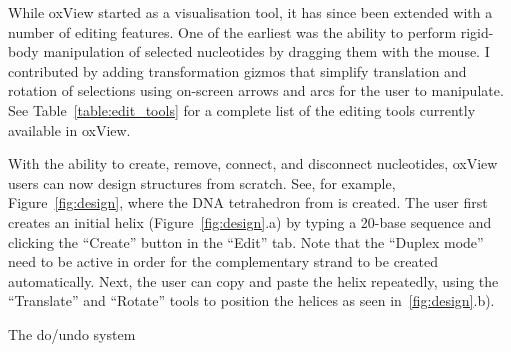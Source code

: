 While oxView started as a visualisation tool, it has since been extended with a number of editing features. One of the earliest was the ability to perform rigid-body manipulation of selected nucleotides by dragging them with the mouse. I contributed by adding transformation gizmos that simplify translation and rotation of selections using on-screen arrows and arcs for the user to manipulate. See Table~\ref{table:edit_tools} for a complete list of the editing tools currently available in oxView.

With the ability to create, remove, connect, and disconnect nucleotides, oxView users can now design structures from scratch. See, for example, Figure~\ref{fig:design}, where the DNA tetrahedron from \cite{goodman2005rapid} is created. The user first creates an initial helix (Figure~\ref{fig:design}.a) by typing a 20-base sequence and clicking the ``Create'' button in the ``Edit'' tab. Note that the ``Duplex mode'' need to be active in order for the complementary strand to be created automatically. Next, the user can copy and paste the helix repeatedly, using the ``Translate'' and ``Rotate'' tools to position the helices as seen in~\ref{fig:design}.b).

The do/undo system


\newcommand{\toolHeight}{1.5em}


